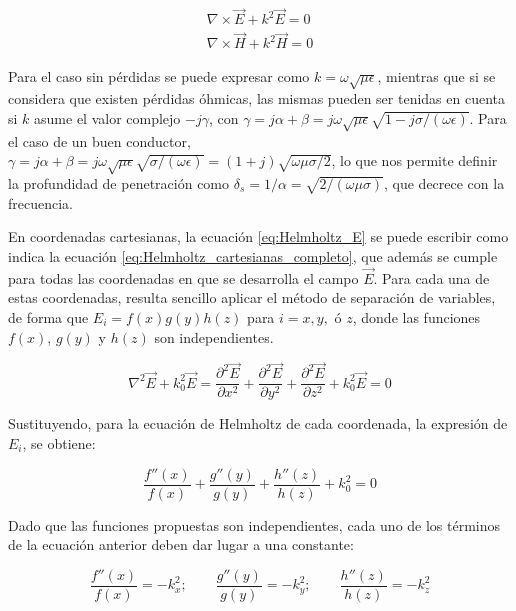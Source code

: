 \begin{subequations}
	\label{eq:Helmholtz}
	\begin{align}
		\nabla \times \vec{E} + k^2 \vec{E} = 0 \label{eq:Helmholtz_E} \\
		\nabla \times \vec{H} + k^2 \vec{H} = 0 \label{eq:Helmholtz_H}
	\end{align}
\end{subequations}

Para el caso sin pérdidas se puede expresar como $k = \omega \sqrt{\mu \epsilon}$, mientras que si se considera que existen pérdidas óhmicas, las mismas pueden ser tenidas en cuenta si $k$ asume el valor complejo $-j\gamma$, con $\gamma = j\alpha + \beta = j \omega \sqrt{\mu \epsilon} \sqrt{1-j \sigma/(\omega \epsilon)}$. Para el caso de un buen conductor, $\gamma = j\alpha + \beta = j \omega \sqrt{\mu \epsilon} \sqrt{\sigma/(\omega \epsilon)} = (1+j) \sqrt{\omega \mu \sigma/2}$, lo que nos permite definir la profundidad de penetración como $\delta_s = 1/\alpha = \sqrt{2/(\omega \mu \sigma)}$, que decrece con la frecuencia.

En coordenadas cartesianas, la ecuación \ref{eq:Helmholtz_E} se puede escribir como indica la ecuación \ref{eq:Helmholtz_cartesianas_completo}, que además se cumple para todas las coordenadas en que se desarrolla el campo $\vec{E}$. Para cada una de estas coordenadas, resulta sencillo aplicar el método de separación de variables, de forma que $E_i = f(x)g(y)h(z)$ para $i=x, y,$ ó $z$, donde las funciones $f(x)$, $g(y)$ y $h(z)$ son independientes.

\begin{equation}
	\label{eq:Helmholtz_cartesianas_completo}
	\nabla^2 \vec{E} + k_0^2 \vec{E} = \frac{\partial^2 \vec{E}}{\partial x^2} + \frac{\partial^2 \vec{E}}{\partial y^2} + \frac{\partial^2 \vec{E}}{\partial z^2} +  k_0^2 \vec{E} = 0
\end{equation}

Sustituyendo, para la ecuación de Helmholtz de cada coordenada, la expresión de $E_i$, se obtiene:

\begin{equation}
	\frac{f''(x)}{f(x)} + \frac{g''(y)}{g(y)} + \frac{h''(z)}{h(z)} + k_0^2 = 0 \nonumber
\end{equation}

Dado que las funciones propuestas son independientes, cada uno de los términos de la ecuación anterior deben dar lugar a una constante:

\begin{equation}
	\frac{f''(x)}{f(x)} = -k_x^2; \qquad \frac{g''(y)}{g(y)} = -k_y^2; \qquad \frac{h''(z)}{h(z)} = -k_z^2 \nonumber
\end{equation}

